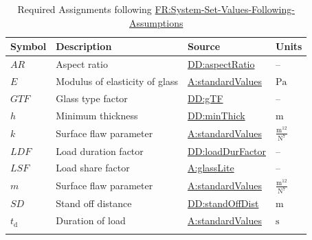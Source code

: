 \documentclass[12pt]{article}
\begin{document}
\begin{longtable}{l l l l}
\toprule
\textbf{Symbol} & \textbf{Description} & \textbf{Source} & \textbf{Units}
\\
\midrule
\endhead
$\mathit{AR}$ & Aspect ratio & \hyperref[DD:aspectRatio]{DD:aspectRatio} & --
\\
$E$ & Modulus of elasticity of glass & \hyperref[assumpSV]{A:standardValues} & ${\text{Pa}}$
\\
$\mathit{GTF}$ & Glass type factor & \hyperref[DD:gTF]{DD:gTF} & --
\\
$h$ & Minimum thickness & \hyperref[DD:minThick]{DD:minThick} & ${\text{m}}$
\\
$k$ & Surface flaw parameter & \hyperref[assumpSV]{A:standardValues} & $\frac{\text{m}^{12}}{\text{N}^{7}}$
\\
$\mathit{LDF}$ & Load duration factor & \hyperref[DD:loadDurFactor]{DD:loadDurFactor} & --
\\
$\mathit{LSF}$ & Load share factor & \hyperref[assumpGL]{A:glassLite} & --
\\
$m$ & Surface flaw parameter & \hyperref[assumpSV]{A:standardValues} & $\frac{\text{m}^{12}}{\text{N}^{7}}$
\\
$\mathit{SD}$ & Stand off distance & \hyperref[DD:standOffDist]{DD:standOffDist} & ${\text{m}}$
\\
${t_{\text{d}}}$ & Duration of load & \hyperref[assumpSV]{A:standardValues} & ${\text{s}}$
\\
\bottomrule
\caption{Required Assignments following \hyperref[sysSetValsFollowingAssumps]{FR:System-Set-Values-Following-Assumptions}}
\label{Table:ReqAssignments}
\end{longtable}
\end{document}
